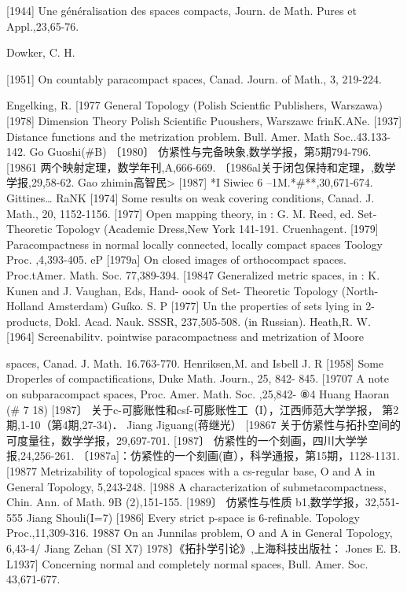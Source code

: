\documentclass[main.tex]{subfiles}
\begin{document}
[1944] Une généralisation des spaces compacts, Journ. de Math. Pures et Appl.,23,65-76.

\noindent Dowker, C. H.

[1951] On countably paracompact spaces, Canad. Journ. of Math., 3, 219-224.

\noindent Engelking, R.
[1977 General Topology (Polish Scientfic Publishers, Warszawa)
[1978]
Dimension
Theory Polish Scientific
Puoushers, Warszawc
frinK.ANe.
[1937]
Distance functions and the metrization problem. Bull. Amer. Math
Soc..43.133-142.
Go Guoshi(\#B)
〔1980〕 仿紧性与完备映象,数学学报，第5期794-796.
[19861 两个映射定理，数学年刊,A,666-669.
〔1986al关于闭包保持和定理，,数学学报,29,58-62.
Gao zhimin高智民>
[1987] *I Siwiec 6 --1M.*\#**,30,671-674.
Gittines… RaNK
[1974]
Some results on weak covering conditions, Canad. J. Math., 20,
1152-1156.
[1977]
Open mapping theory, in : G. M. Reed, ed. Set-Theoretic Topologv
(Academic Dress,New York 141-191.
Cruenhagent.
[1979]
Paracompactness in normal locally connected,
locally compact
spaces Toology Proc.
,4,393-405.
eP [1979a]
On closed images of orthocompact
spaces. Proc.tAmer. Math. Soc.
77,389-394.
[19847 Generalized metric spaces, in : K. Kunen and J. Vaughan, Eds, Hand-
oook of Set- Theoretic Topology (North-Holland Amsterdam)
Guíko. S. P
[1977]
Un
the properties of sets lying in 2-products, Dokl. Acad. Nauk.
SSSR, 237,505-508. (in Russian).
Heath,R. W.
[1964]
Screenabilitv. pointwise paracompactness and
metrization of Moore

spaces, Canad. J. Math. 16.763-770.
Henriksen,M. and Isbell J. R
[1958]
Some Droperles
of compactifications, Duke Math. Journ., 25, 842-
845.
[19707 A note on subparacompact spaces, Proc. Amer. Math. Soc. ,25,842-
⑧4
Huang Haoran (# 7 18)
[1987〕 关于c-可膨账性和csf-可膨账性工（I），江西师范大学学报，
第2期,1-10（第4期,27-34)．
Jiang Jiguang(蒋继光）
[19867 关于仿紧性与拓扑空间的可度量往，数学学报，29,697-701.
[1987〕 仿紧性的一个刻画，四川大学学报,24,256-261.
〔1987a]：仿紧性的一个刻画(直），科学通报，第15期，1128-1131.
[19877 Metrizability of topological spaces with a cs-regular base, O and A
in General Topology, 5,243-248.
[1988 A characterization of submetacompactness, Chin. Ann. of Math. 9B
(2),151-155.
[1989〕 仿紧性与性质 b1,数学学报，32,551-555
Jiang Shouli(I=7)
[1986] Every strict p-space is 6-refinable. Topology Proc.,11,309-316.
19887 On an Junnilas problem, O and A in General Topology, 6,43-4/
Jiang Zehan (SI X7)
1978〕《拓扑学引论》,上海科技出版社：
Jones E. B.
L1937] Concerning normal and completely normal spaces, Bull. Amer. Soc.
43,671-677.
\end{document}
